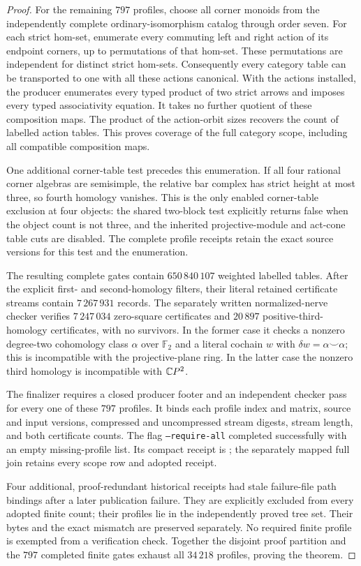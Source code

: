 \begin{proof}
For the remaining $797$ profiles, choose all corner monoids from
the independently complete ordinary-isomorphism catalog through
order seven. For each strict hom-set, enumerate every commuting
left and right action of its endpoint corners, up to permutations
of that hom-set. These permutations are independent for distinct
strict hom-sets. Consequently every category table can be
transported to one with all these actions canonical. With the
actions installed, the producer enumerates every typed product
of two strict arrows and imposes every typed associativity
equation. It takes no further quotient of these composition maps.
The product of the action-orbit sizes recovers the count of
labelled action tables. This proves coverage of the full category
scope, including all compatible composition maps.

One additional corner-table test precedes this enumeration.
If all four rational corner algebras are semisimple, the relative
bar complex has strict height at most three, so fourth homology
vanishes. This is the only enabled corner-table exclusion at four
objects: the shared two-block test explicitly returns false when
the object count is not three, and the inherited projective-module
and act-cone table cuts are disabled. The complete profile receipts
retain the exact source versions for this test and the enumeration.

The resulting complete gates contain $650\,840\,107$ weighted
labelled tables. After the explicit first- and second-homology
filters, their literal retained certificate streams contain
$7\,267\,931$ records. The separately written normalized-nerve
checker verifies $7\,247\,034$ zero-square certificates and
$20\,897$ positive-third-homology certificates, with no survivors.
In the former case it checks a nonzero degree-two cohomology
class $\alpha$ over $\mathbb F_2$ and a literal cochain $w$ with
$\delta w=\alpha\smile\alpha$; this is incompatible with the
projective-plane ring. In the latter case the nonzero third
homology is incompatible with $\mathbb{C}P^2$.

The finalizer requires a closed producer footer and an independent
checker pass for every one of these $797$ profiles. It binds each
profile index and matrix, source and input versions, compressed
and uncompressed stream digests, stream length, and both
certificate counts. The flag \texttt{--require-all} completed
successfully with an empty missing-profile list. Its compact
receipt is
; the
separately mapped full join retains every scope row and adopted
receipt.

Four additional, proof-redundant historical receipts had stale
failure-file path bindings after a later publication failure.
They are explicitly excluded from every adopted finite count;
their profiles lie in the independently proved tree set. Their
bytes and the exact mismatch are preserved separately. No
required finite profile is exempted from a verification check.
Together the disjoint proof partition and the $797$ completed
finite gates exhaust all $34\,218$ profiles, proving the theorem.
\end{proof}
